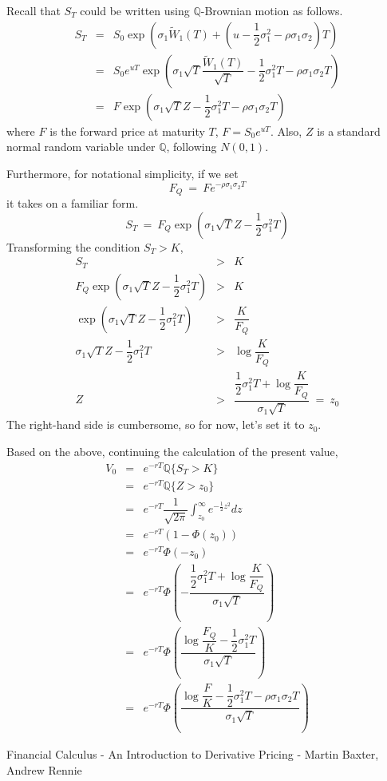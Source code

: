 \documentclass[uplatex,a4j,12pt,dvipdfmx]{jsarticle}
\begin{document}
Recall that $S_{T}$ could be written using $\mathbb{Q}$-Brownian motion as follows.
%
%
\begin{eqnarray*}
	S_{T}
	&=&
	S_{0}
	\exp \left( \sigma_{1} \tilde{W}_{1}(T) +
	\left(
		u - \dfrac{1}{2} \sigma_{1}^{2} - \rho \sigma_{1} \sigma_{2}
		\right)
	T \right)
	\\ &=&
	S_{0}e^{uT}
	\exp \left( \sigma_{1} \sqrt{T} \dfrac{ \tilde{W}_{1}(T) }{ \sqrt{T} } -
	\dfrac{1}{2} \sigma_{1}^{2} T -
	\rho \sigma_{1} \sigma_{2} T \right)
	\\ &=&
	F
	\exp \left( \sigma_{1} \sqrt{T} Z -
	\dfrac{1}{2} \sigma_{1}^{2} T  -
	\rho \sigma_{1} \sigma_{2} T \right)
\end{eqnarray*}
%
%
where $F$ is the forward price at maturity $T$, $F = S_{0} e^{uT}$. Also, $Z$ is a standard normal random variable under $\mathbb{Q}$, following $N(0,1)$.

Furthermore, for notational simplicity, if we set
$$
	F_{Q} \ = \ F e^{- \rho \sigma_{1} \sigma_{2} T}
$$
it takes on a familiar form.
$$
	S_{T}
	\ = \
	F_{Q}
	\exp \left( \sigma_{1} \sqrt{T} Z -
	\dfrac{1}{2} \sigma_{1}^{2} T
	\right)
$$
Transforming the condition $S_{T}>K$,
%
%
\begin{eqnarray*}
	S_{T}
	&>&
	K
	\\
	F_{Q}
	\exp \left( \sigma_{1} \sqrt{T} Z -
	\dfrac{1}{2} \sigma_{1}^{2} T
	\right)
	&>&
	K
	\\
	\exp \left( \sigma_{1} \sqrt{T} Z -
	\dfrac{1}{2} \sigma_{1}^{2} T
	\right)
	&>&
	\dfrac{K}{F_{Q}}
	\\
	\sigma_{1} \sqrt{T} Z -
	\dfrac{1}{2} \sigma_{1}^{2} T
	&>&
	\log
	\dfrac{K}{F_{Q}}
	\\
	Z
	&>&
	\dfrac{
		\dfrac{1}{2} \sigma_{1}^{2} T +
		\log
		\dfrac{K}{F_{Q}}
	}{\sigma_{1} \sqrt{T}}
	\ = \
	z_{0}
\end{eqnarray*}
%
%
The right-hand side is cumbersome, so for now, let's set it to $z_{0}$.

Based on the above, continuing the calculation of the present value,
%
%
\begin{eqnarray*}
	V_{0}
	&=&
	e^{-rT}
	\mathbb{Q}
	\{ S_{T} > K \}
	\\ &=&
	e^{-rT}
	\mathbb{Q}
	\{ Z > z_{0} \}
	\\ &=&
	e^{-rT}
	\dfrac{1}{ \sqrt{2 \pi} }
	\int^{\infty}_{z_{0}}
	e^{
			- \frac{1}{2} z^{2}
		} dz
	\\ &=&
	e^{-rT}
	\left( 1 - \Phi(z_0) \right)
	\\ &=&
	e^{-rT}
	\Phi(-z_{0})
	\\ &=&
	e^{-rT}
	\Phi
	\left(
	- \dfrac{
		\dfrac{1}{2} \sigma_{1}^{2} T +
		\log
		\dfrac{K}{F_{Q}}
	}{\sigma_{1} \sqrt{T}}
	\right)
	\\ &=&
	e^{-rT}
	\Phi
	\left(
	\dfrac{
		\log
		\dfrac{F_{Q}}{K}
		-
		\dfrac{1}{2} \sigma_{1}^{2} T
	}{\sigma_{1} \sqrt{T}}
	\right)
	\\ &=&
	e^{-rT}
	\Phi
	\left(
	\dfrac{
		\log
		\dfrac{F}{K}
		-
		\dfrac{1}{2} \sigma_{1}^{2} T
		-
		\rho \sigma_{1} \sigma_{2} T
	}{\sigma_{1} \sqrt{T}}
	\right)
\end{eqnarray*}
%
%


\begin{thebibliography}{9}
	Financial Calculus - An Introduction to Derivative Pricing - Martin Baxter, Andrew Rennie
\end{thebibliography}
\end{document}
